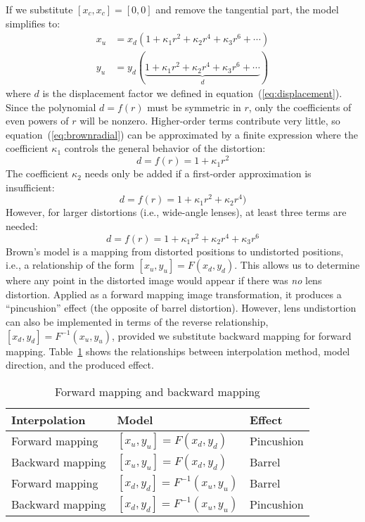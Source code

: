 \documentclass[english,12pt]{ifimaster}
\begin{document}
If we substitute $[x_c, x_c] = [0, 0]$ and remove the tangential part,
the model simplifies to:
\begin{equation}
  \label{eq:brownradial}
  \begin{split}
    x_u &= x_d(1 + \kappa_1r^2 + \kappa_2r^4 + \kappa_3r^6 + \dotsb)\\
    y_u &= y_d(\underbrace{1 + \kappa_1r^2 + \kappa_2r^4 + \kappa_3r^6 + \dotsb}_d)
  \end{split}
\end{equation}
where $d$ is the displacement factor we defined in
equation~(\ref{eq:displacement}). Since the polynomial $d = f(r)$ must
be symmetric in $r$, only the coefficients of even powers of $r$ will
be nonzero. Higher-order terms contribute very little, so
equation~(\ref{eq:brownradial}) can be approximated by a finite
expression where the coefficient $\kappa_1$ controls the general
behavior of the distortion:
\begin{equation}
  \label{eq:taylorone}
  d = f(r) = 1 + \kappa_1r^2
\end{equation}
The coefficient $\kappa_2$ needs only be added if a first-order
approximation is insufficient:
\begin{equation}
  \label{eq:taylortwo}
  d = f(r) = 1 + \kappa_1r^2 + \kappa_2r^4)
\end{equation}
However, for larger distortions (i.e., wide-angle lenses), at least
three terms are needed:
\begin{equation}
  \label{eq:taylorthree}
  d = f(r) = 1 + \kappa_1r^2 + \kappa_2r^4 + \kappa_3r^6
\end{equation}
Brown's model is a mapping from distorted positions to undistorted
positions, i.e., a relationship of the form $[x_u, y_u] = F(x_d,
y_d)$. This allows us to determine where any point in the distorted
image would appear if there was \emph{no} lens distortion. Applied as
a forward mapping image transformation, it produces a ``pincushion''
effect (the opposite of barrel distortion). However, lens undistortion
can also be implemented in terms of the reverse relationship, $[x_d,
y_d] = F^{-1}(x_u, y_u)$, provided we substitute backward mapping for
forward mapping. Table~\ref{tab:mappings} shows the relationships
between interpolation method, model direction, and the produced
effect.

\begin{table}
  \centering
  \begin{tabular}{@{}lll@{}}
    \toprule
    Interpolation & Model & Effect \\
    \midrule
    Forward mapping & $[x_u, y_u] = F(x_d, y_d)$ & Pincushion \\
    Backward mapping & $[x_u, y_u] = F(x_d, y_d)$ & Barrel \\
    Forward mapping & $[x_d, y_d] = F^{-1}(x_u, y_u)$ & Barrel \\
    Backward mapping & $[x_d, y_d] = F^{-1}(x_u, y_u)$ & Pincushion \\
    \bottomrule
  \end{tabular}

  \caption{Forward mapping and backward mapping}
  \label{tab:mappings}
\end{table}
\end{document}
